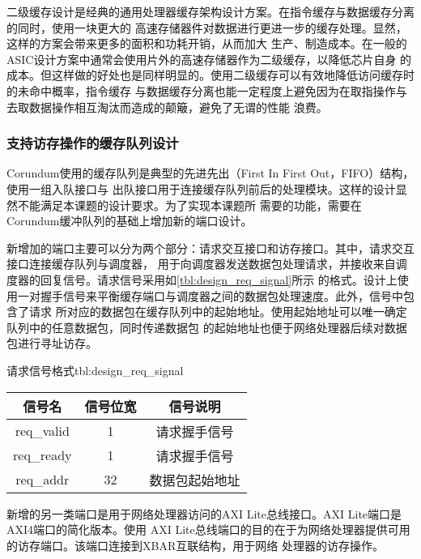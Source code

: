 
二级缓存设计是经典的通用处理器缓存架构设计方案。在指令缓存与数据缓存分离的同时，使用一块更大的
高速存储器件对数据进行更进一步的缓存处理。显然，这样的方案会带来更多的面积和功耗开销，从而加大
生产、制造成本。在一般的ASIC设计方案中通常会使用片外的高速存储器作为二级缓存，以降低芯片自身
的成本。但这样做的好处也是同样明显的。使用二级缓存可以有效地降低访问缓存时的未命中概率，指令缓存
与数据缓存分离也能一定程度上避免因为在取指操作与去取数据操作相互淘汰而造成的颠簸，避免了无谓的性能
浪费。

\subsubsection{支持访存操作的缓存队列设计}

Corundum使用的缓存队列是典型的先进先出（First In First Out，FIFO）结构，使用一组入队接口与
出队接口用于连接缓存队列前后的处理模块。这样的设计显然不能满足本课题的设计要求。为了实现本课题所
需要的功能，需要在Corundum缓冲队列的基础上增加新的端口设计。

新增加的端口主要可以分为两个部分：请求交互接口和访存接口。其中，请求交互接口连接缓存队列与调度器，
用于向调度器发送数据包处理请求，并接收来自调度器的回复信号。请求信号采用如\autoref{tbl:design_req_signal}所示
的格式。设计上使用一对握手信号来平衡缓存端口与调度器之间的数据包处理速度。此外，信号中包含了请求
所对应的数据包在缓存队列中的起始地址。使用起始地址可以唯一确定队列中的任意数据包，同时传递数据包
的起始地址也便于网络处理器后续对数据包进行寻址访存。

\begin{generaltab}{请求信号格式}{tbl:design_req_signal}
  \begin{tabular}{ccc}
    \toprule
    信号名 & 信号位宽 & 信号说明 \\
    \midrule
    req\_valid & 1 & 请求握手信号 \\
    req\_ready & 1 & 请求握手信号 \\
    req\_addr & 32 & 数据包起始地址 \\
    \bottomrule
  \end{tabular}
\end{generaltab}

新增的另一类端口是用于网络处理器访问的AXI Lite总线接口。AXI Lite端口是AXI4端口的简化版本\cite{intro_amba_axi}。使用
AXI Lite总线端口的目的在于为网络处理器提供可用的访存端口。该端口连接到XBAR互联结构，用于网络
处理器的访存操作。

